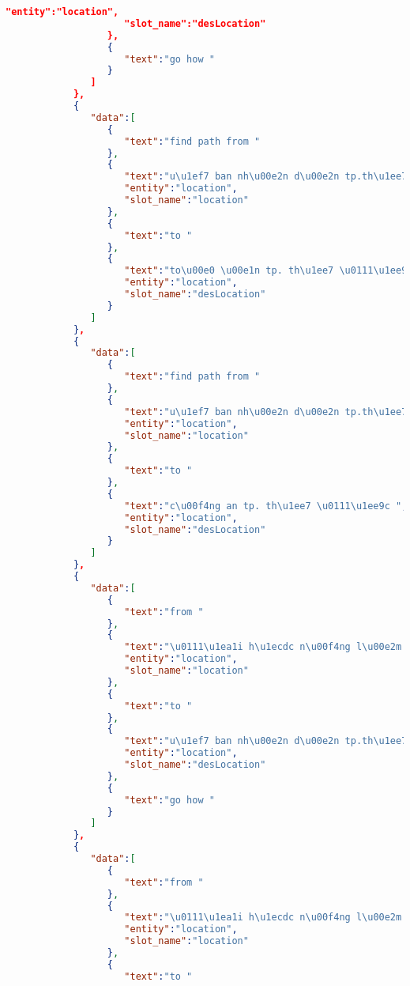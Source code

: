 \begin{lstlisting}[language=json,firstnumber=1]
                     "entity":"location",
                     "slot_name":"desLocation"
                  },
                  {
                     "text":"go how "
                  }
               ]
            },
            {
               "data":[
                  {
                     "text":"find path from "
                  },
                  {
                     "text":"u\u1ef7 ban nh\u00e2n d\u00e2n tp.th\u1ee7 \u0111\u1ee9c ",
                     "entity":"location",
                     "slot_name":"location"
                  },
                  {
                     "text":"to "
                  },
                  {
                     "text":"to\u00e0 \u00e1n tp. th\u1ee7 \u0111\u1ee9c ",
                     "entity":"location",
                     "slot_name":"desLocation"
                  }
               ]
            },
            {
               "data":[
                  {
                     "text":"find path from "
                  },
                  {
                     "text":"u\u1ef7 ban nh\u00e2n d\u00e2n tp.th\u1ee7 \u0111\u1ee9c ",
                     "entity":"location",
                     "slot_name":"location"
                  },
                  {
                     "text":"to "
                  },
                  {
                     "text":"c\u00f4ng an tp. th\u1ee7 \u0111\u1ee9c ",
                     "entity":"location",
                     "slot_name":"desLocation"
                  }
               ]
            },
            {
               "data":[
                  {
                     "text":"from "
                  },
                  {
                     "text":"\u0111\u1ea1i h\u1ecdc n\u00f4ng l\u00e2m ",
                     "entity":"location",
                     "slot_name":"location"
                  },
                  {
                     "text":"to "
                  },
                  {
                     "text":"u\u1ef7 ban nh\u00e2n d\u00e2n tp.th\u1ee7 \u0111\u1ee9c ",
                     "entity":"location",
                     "slot_name":"desLocation"
                  },
                  {
                     "text":"go how "
                  }
               ]
            },
            {
               "data":[
                  {
                     "text":"from "
                  },
                  {
                     "text":"\u0111\u1ea1i h\u1ecdc n\u00f4ng l\u00e2m ",
                     "entity":"location",
                     "slot_name":"location"
                  },
                  {
                     "text":"to "

\end{lstlisting}
